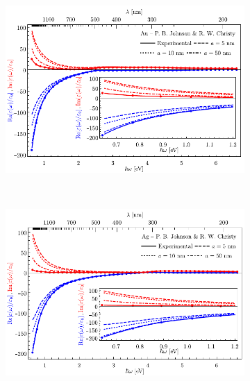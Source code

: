 	\begin{figure}[h!]\centering\hspace*{-1.5em}
	\begin{subfigure}{.01\linewidth}\caption{}\label{sfig:sizeAu}\vspace{7cm}\end{subfigure}
	\begin{subfigure}{.7\linewidth}\hspace*{-1em}
	\includegraphics[scale=1]{1-Teoria/figs/0-sizeAuEpsilon.pdf}
	\end{subfigure}\\ \hspace*{-1.5em}
	\begin{subfigure}{.01\linewidth}\caption{}\label{sfig:sizeAg}\vspace{7cm}\end{subfigure}
	\begin{subfigure}{.7\linewidth}\hspace*{-1em}
	\includegraphics[scale=1]{1-Teoria/figs/0-sizeAgEpsilon.pdf}

\end{subfigure}
\end{figure}
